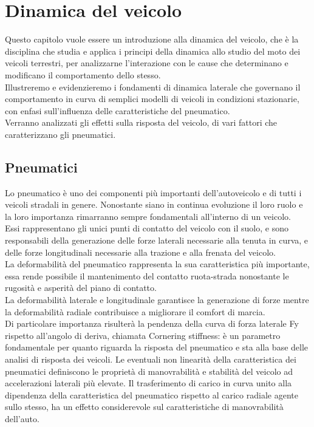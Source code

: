 \chapter{Dinamica del veicolo}
\label{cha:cap1}
 
Questo capitolo vuole essere un introduzione alla dinamica del veicolo,
che è la disciplina che studia e applica i principi della dinamica allo studio del moto dei veicoli terrestri, per analizzarne l'interazione con le cause che determinano e modificano il comportamento dello stesso.\\
Illustreremo e evidenzieremo i fondamenti di dinamica laterale che governano il comportamento in curva di semplici modelli di veicoli in condizioni stazionarie,  
con enfasi sull'influenza delle caratteristiche del pneumatico.\\
Verranno analizzati gli effetti sulla risposta del veicolo, di vari fattori che caratterizzano gli pneumatici.

\section{Pneumatici}
Lo pneumatico è uno dei componenti più 
importanti dell’autoveicolo e di tutti i veicoli
stradali in genere.
Nonostante siano in continua evoluzione il loro ruolo e la loro importanza rimarranno sempre fondamentali all'interno di un veicolo.\\
Essi rappresentano gli unici punti di contatto del veicolo con il suolo, e sono responsabili della generazione delle 
forze laterali necessarie alla tenuta in curva, e delle forze longitudinali necessarie alla trazione  e alla frenata del veicolo.\\
La deformabilità del pneumatico rappresenta la sua caratteristica più importante, essa rende possibile il mantenimento del contatto ruota-strada nonostante le rugosità e asperità del piano di contatto.\\
La deformabilità laterale e longitudinale garantisce la generazione di forze mentre la deformabilità radiale contribuisce a migliorare il comfort di marcia.\\
Di particolare importanza risulterà
la pendenza della curva di forza laterale Fy rispetto all'angolo di deriva, chiamata Cornering stiffness: è un parametro fondamentale per quanto riguarda la risposta del pneumatico e sta alla base delle analisi di risposta dei veicoli.
Le eventuali non linearità della caratteristica dei pneumatici definiscono  
le proprietà di manovrabilità e stabilità del veicolo ad accelerazioni laterali più elevate.
Il trasferimento di carico in curva unito alla dipendenza della caratteristica del pneumatico rispetto al carico radiale
agente sullo stesso, ha un effetto considerevole sul caratteristiche di manovrabilità dell'auto.

